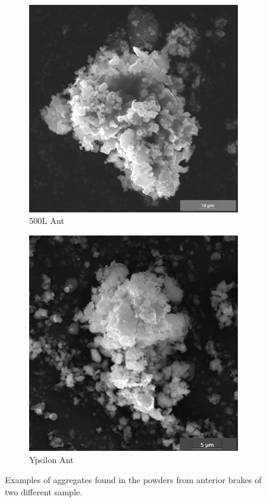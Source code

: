 \begin{figure}[H]
\centering
\begin{subfigure}{.5\textwidth}
  \centering
  \includegraphics[width=1\linewidth]{images/500L-ANT05-copia.png}
  \caption{500L Ant}
  \label{fig:Aggregates_500L_Ant}
\end{subfigure}%
\begin{subfigure}{.5\textwidth}
  \centering
  \includegraphics[width=0.97\linewidth]{images/YPSILON-ANT04.png}
  \caption{Ypsilon Ant}
  \label{fig:Aggregates_Y_Ant}
\end{subfigure}
\caption{Examples of aggregates found in the powders from anterior brakes of two different sample.}
\label{fig:Aggregates_Ant}
\end{figure}

